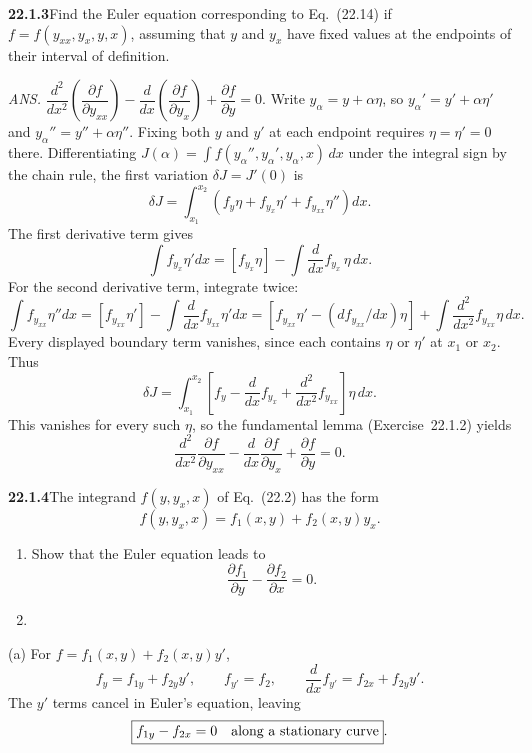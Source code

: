 \par\bigskip
\noindent\textbf{22.1.3}\quad Find the Euler equation
corresponding to Eq.~(22.14) if $f=f(y_{xx},y_{x},y,x)$, assuming
that $y$ and $y_{x}$ have fixed values at the endpoints of their
interval of definition.
\par\nobreak\hfill\emph{ANS.}\enspace
$\dfrac{d^{2}}{dx^{2}}\left(\dfrac{\partial f}{\partial y_{xx}}
\right)-\dfrac{d}{dx}\left(\dfrac{\partial f}{\partial y_{x}}
\right)+\dfrac{\partial f}{\partial y}=0$.
\solution
Write $y_\alpha=y+\alpha\eta$, so $y_\alpha'=y'+\alpha\eta'$ and
$y_\alpha''=y''+\alpha\eta''$. Fixing both $y$ and $y'$ at each
endpoint requires $\eta=\eta'=0$ there. Differentiating
$J(\alpha)=\int f(y_\alpha'',y_\alpha',y_\alpha,x)\,dx$ under the
integral sign by the chain rule, the first variation
$\delta J=J'(0)$ is
\[
\delta J=\int_{x_1}^{x_2}
(f_y\eta+f_{y_x}\eta'+f_{y_{xx}}\eta'')dx.
\]
The first derivative term gives
\[
\int f_{y_x}\eta'dx
=[f_{y_x}\eta]-\int\frac d{dx}f_{y_x}\,\eta\,dx.
\]
For the second derivative term, integrate twice:
\[
\int f_{y_{xx}}\eta''dx
=[f_{y_{xx}}\eta']-\int\frac d{dx}f_{y_{xx}}\eta'dx
=[f_{y_{xx}}\eta'-(d f_{y_{xx}}/dx)\eta]
+\int\frac{d^2}{dx^2}f_{y_{xx}}\eta\,dx.
\]
Every displayed boundary term vanishes, since each contains $\eta$ or
$\eta'$ at $x_1$ or $x_2$. Thus
\[
\delta J=\int_{x_1}^{x_2}
\left[f_y-\frac d{dx}f_{y_x}
+\frac{d^2}{dx^2}f_{y_{xx}}\right]\eta\,dx.
\]
This vanishes for every such $\eta$, so the fundamental lemma
(Exercise~22.1.2) yields
\[
\boxed{\frac{d^2}{dx^2}\frac{\partial f}{\partial y_{xx}}
-\frac d{dx}\frac{\partial f}{\partial y_x}
+\frac{\partial f}{\partial y}=0}.
\]


\par\bigskip
\noindent\textbf{22.1.4}\quad The integrand $f(y,y_{x},x)$ of
Eq.~(22.2) has the form
\[
f(y,y_{x},x)=f_{1}(x,y)+f_{2}(x,y)y_{x}.
\]
\begin{enumerate}
\item[(a)] Show that the Euler equation leads to
\[
\frac{\partial f_{1}}{\partial y}-\frac{\partial f_{2}}{\partial x}
=0.
\]
\item[(b)] 
\end{enumerate}
\solution
(a) For $f=f_1(x,y)+f_2(x,y)y'$,
\[
f_y=f_{1y}+f_{2y}y',\qquad
f_{y'}=f_2,\qquad
\frac d{dx}f_{y'}=f_{2x}+f_{2y}y'.
\]
The $y'$ terms cancel in Euler's equation, leaving
\[
\boxed{f_{1y}-f_{2x}=0\quad\hbox{along a stationary curve}}.
\]

